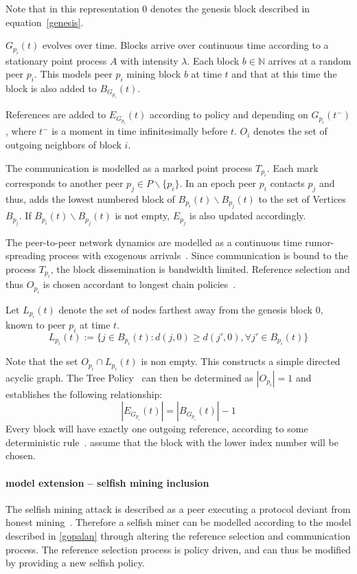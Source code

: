Note that in this representation $0$ denotes the genesis block described in equation~\ref{genesis}.

$G_{p_i}(t)$ evolves over time. Blocks arrive over continuous time according to a stationary point process $A$ with intensity $\lambda$. Each block $b \in \mathbb{N}$ arrives at a random peer $p_i$.
This models peer $p_i$ mining block $b$ at time $t$ and that at this time the block is also added to $B_{G_{p_i}}(t)$.

References are added to $E_{G_{p_i}}(t)$ according to policy and depending on $G_{p_i}(t^-)$, where $t^-$ is a moment in time infinitesimally before $t$. $O_i$ denotes the set of outgoing neighbors of block $i$.

The communication is modelled as a marked point process $T_{p_i}$.
Each mark corresponds to another peer $p_j \in P\backslash \{p_i\}$.
In an epoch peer $p_i$ contacts $p_j$ and thus, adds the lowest numbered block of $B_{p_i}(t)\backslash B_{p_j}(t)$ to the set of Vertices $B_{p_j}$. If $B_{p_i}(t)\backslash B_{p_j}(t)$ is not empty, $E_{p_j}$ is also updated accordingly.

The peer-to-peer network dynamics are modelled as a continuous time rumor-spreading process with exogenous arrivals~\citep{gopalan}. Since communication is bound to the process $T_{p_i}$, the block dissemination is bandwidth limited.
Reference selection and thus $O_{p_i}$ is chosen accordant to longest chain policies~\citep{gopalan}.

Let $L_{p_i}(t)$ denote the set of nodes farthest away from the genesis block $0$, known to peer $p_i$ at time $t$.
\begin{equation}
L_{p_i}(t) := \{j \in B_{p_i}(t): d(j,0)\geq d(j',0), \forall j' \in B_{p_i}(t) \}
\label{policy}
\end{equation}

Note that the set $O_{p_i} \cap L_{p_i}(t)$ is non empty. This constructs a simple directed acyclic graph. The Tree Policy~\citep{gopalan} can then be determined as $|O_{p_i}|=1$ and establishes the following relationship:
\begin{equation}
|E_{G_{p_i}}(t)| = |B_{G_{p_i}}(t)| -1
\end{equation}
Every block will have exactly one outgoing reference, according to some deterministic rule~\citep{gopalan}. \citeauthor{gopalan} assume that the block with the lower index number will be chosen.


\paragraph{model extension -- selfish mining inclusion}\label{selfishmodel}
The selfish mining attack is described as a peer executing a protocol deviant from honest mining~\citep{eyal}. Therefore a selfish miner can be modelled according to the model described in \ref{gopalan} through altering the reference selection and communication process. The reference selection process is policy driven, and can thus be modified by providing a new selfish policy. 


